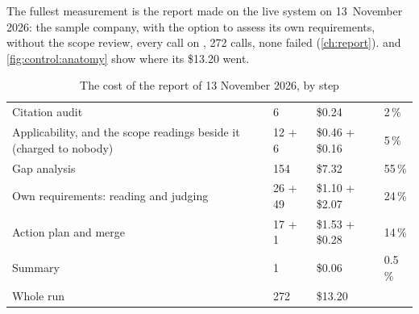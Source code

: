 The fullest measurement is the report made on the live system on 13~November 2026: the
sample company, with the option to assess its own requirements, without the scope review,
every call on , 272 calls, none failed (\cref{ch:report}).
 and \cref{fig:control:anatomy} show where its \$13.20 went.

\begin{table}[H]
\caption{The cost of the report of 13 November 2026, by step}\label{tab:control:anatomy}
\begin{tabularx}{\textwidth}{@{}YR{14mm}R{26mm}R{14mm}@{}}
\toprule
{} &  &  &  \\
\midrule
Citation audit & 6 & \$0.24 & 2\,\% \\
Applicability, and the scope readings beside it (charged to nobody) & 12 + 6 & \$0.46 + \$0.16 & 5\,\% \\
Gap analysis & 154 & \$7.32 & 55\,\% \\
Own requirements: reading and judging & 26 + 49 & \$1.10 + \$2.07 & 24\,\% \\
Action plan and merge & 17 + 1 & \$1.53 + \$0.28 & 14\,\% \\
Summary & 1 & \$0.06 & 0.5\,\% \\
\midrule
Whole run & 272 & \$13.20 & \\
\bottomrule
\end{tabularx}
\end{table}


